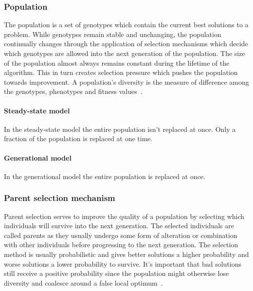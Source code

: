 \subsubsection{Population}

The population is a set of genotypes which contain the current best solutions to a problem. While genotypes remain stable and unchanging, the population continually changes through the application of selection mechanisms which decide which genotypes are allowed into the next generation of the population. The size of the population almost always remains constant during the lifetime of the algorithm. This in turn creates selection pressure which pushes the population towards improvement. A population's diversity is the measure of difference among the genotypes, phenotypes and fitness values~\cite{Eiben2015_whatevolutionary}.

\paragraph{Steady-state model}

In the steady-state model the entire population isn't replaced at once. Only a fraction of the population is replaced at one time.

\paragraph{Generational model}

In the generational model the entire population is replaced at once.

\subsubsection{Parent selection mechanism}

Parent selection serves to improve the quality of a population by selecting which individuals will survive into the next generation. The selected individuals are called parents as they usually undergo some form of alteration or combination with other individuals before progressing to the next generation. The selection method is usually probabilistic and gives better solutions a higher probability and worse solutions a lower probability to survive. It's important that bad solutions still receive a positive probability since the population might otherwise lose diversity and coalesce around a false local optimum~\cite{Eiben2015_whatevolutionary}.



